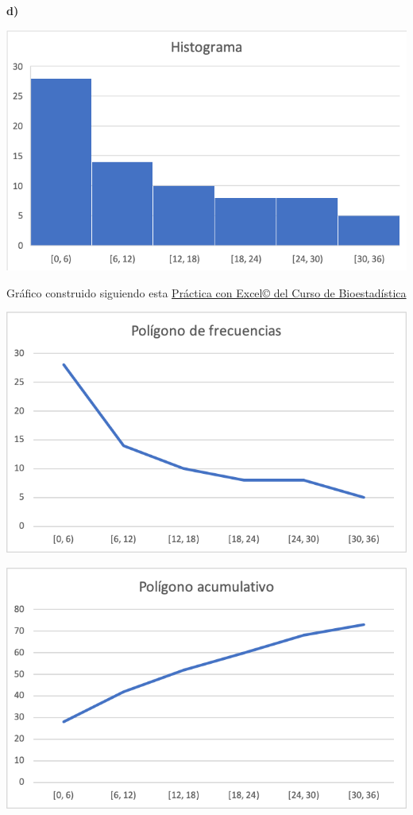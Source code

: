 \documentclass[
]{book}
\begin{document}
\textbf{d)}

\includegraphics[width=10in]{img/1_3}

Gráfico construido siguiendo esta \href{https://1fjmanzano.github.io/bioestadistica/histogramas.html\#histogramas-con-excel-pr\%C3\%A1cticas}{Práctica con Excel© del Curso de Bioestadística}

\includegraphics[width=10.03in]{img/1_4}

\includegraphics[width=10.03in]{img/1_5}
\end{document}
